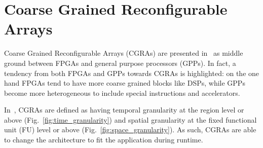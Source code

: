 %
%

\section{Coarse Grained Reconfigurable Arrays}
\label{sec:CGRAs_Versat}
Coarse Grained Reconfigurable Arrays (CGRAs) are presented
in~\cite{CGRA:Overview2016_wijtvliet} as middle ground between FPGAs and general
purpose processors (GPPs). In fact, a tendency from both FPGAs and GPPs towards
CGRAs is highlighted: on the one hand FPGAs tend to have more coarse grained
blocks like DSPs, while GPPs become more heterogeneous to include special
instructions and accelerators.

In~\cite{CGRA:Overview2016_wijtvliet}, CGRAs are defined as having temporal
granularity at the region level or above (Fig.~\ref{fig:time_granularity}) and
spatial granularity at the fixed functional unit (FU) level or above
(Fig.~\ref{fig:space_granularity}). As such, CGRAs are able to change the
architecture to fit the application during runtime.

